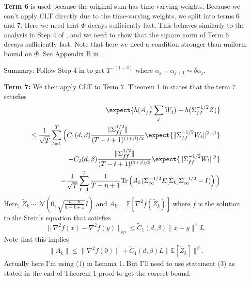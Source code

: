\textbf{Term 6} is used because the original sum has time-varying weights.
Because we can't apply CLT directly due to the time-varying weights, we split into terms 6 and 7.
Here we need that $\Phi$ decays sufficiently fast.
This behaves similarly to the analysis in Step 4 of \citep{srikant2024CLT}, and we need to show that the square norm of Term 6 decays sufficiently fast.
Note that here we need a condition stronger than uniform bound on $\Phi$.
See Appendix B in \citep{srikant2024CLT}.

Summary: Follow Step 4 in \citep{srikant2024CLT} to get $T^{-(1-\delta)}$ where $\alpha_j - \alpha_{j+1} \sim \delta \alpha_j$. 


\textbf{Term 7:}
We then apply CLT to Term 7.
 Theorem 1 in \citep{srikant2024CLT} states that the term 7 satisfies 
\begin{align*}
    \expect{h(A_{ff}^{-1} \sum_j W_j) - h(\Sigma_{ff}^{-1/2} Z)} 
    \\
    \leq 
    \frac{1}{\sqrt{T}} \sum_{t=1}^T \Big(
        C_1 (d, \beta) \frac{\lVert \Sigma_{ff}^{1/2} \rVert}{(T - t + 1)^{(1+\beta)/2}} \expect{\lVert \Sigma_{ff}^{-1/2} W_t \rVert^{2 + \beta}} 
        \\
        + C_2(d, \beta) \frac{\lVert \Sigma_{ff}^{1/2} \rVert}{(T - t + 1)^{(1+\beta)/2}} \expect{\lVert \Sigma_{ff}^{-1/2} W_t \rVert^{ \beta}} 
        \\
        - \frac{1}{\sqrt{T}}\sum_{t=1}^T \frac{1}{T - n + 1} \mathrm{Tr}\left(
            A_k (\Sigma_\infty^{-1/2} E[\Sigma_k] \Sigma_\infty^{-1/2} - I)
        \right)
    \Big)    
\end{align*}
Here, $\tilde{Z}_k \sim \mathcal{N}(0, \sqrt{\frac{n-k}{n-k+1}} I)$ and $A_k = \mathbb{E}[\nabla^2 f(\tilde{Z}_k)]$ where $f$ is the solution to the Stein's equation that satisfies
\begin{equation}
    \lVert \nabla^2 f(x) - \nabla^2 f(y) \rVert_{op} \leq \tilde{C}_1(d, \beta) \lVert x - y \rVert^\beta L .
\end{equation}
Note that this implies
\begin{align*}
    \lVert A_k \rVert \leq \lVert \nabla^2 f(0) \rVert + \tilde{C}_1 (d, \beta) L \lVert \mathbb{E}[ \tilde{Z}_k ] \rVert^\beta.
\end{align*}
{\color{red}Actually here I'm using (1) in Lemma 1. 
But I'll need to use statement (3) as stated in the end of Theorem 1 proof to get the correct bound.}

